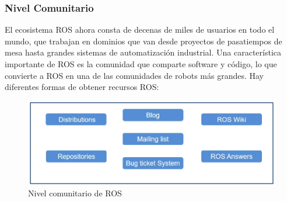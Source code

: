                \newpage
               
            \subsubsection{Nivel Comunitario}
            
            El ecosistema ROS ahora consta de decenas de miles de usuarios en todo el mundo, que trabajan en dominios que van desde proyectos de pasatiempos de mesa hasta grandes sistemas de automatización industrial. 
            Una característica importante de ROS es la comunidad que comparte software y código, lo que convierte a ROS en una de las comunidades de robots más grandes. Hay diferentes formas de obtener recursos ROS:

            \begin{figure}[htb]
                \centering
                \includegraphics[width=0.9\linewidth]{Main/Chapter3/Images3/n_s_a_15.png}
                \caption{Nivel comunitario de ROS \cite{lentin_2017}}
                \label{f:Cap3_conceptos_15}
            \end{figure}        
            
